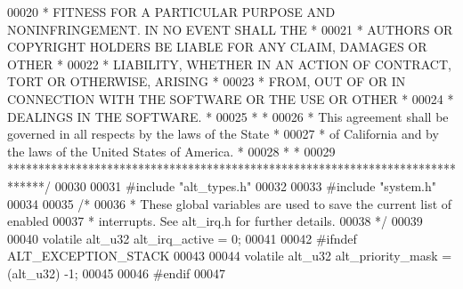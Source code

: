 \begin{DoxyCode}
00020 \textcolor{comment}{* FITNESS FOR A PARTICULAR PURPOSE AND NONINFRINGEMENT. IN NO EVENT SHALL THE *}
00021 \textcolor{comment}{* AUTHORS OR COPYRIGHT HOLDERS BE LIABLE FOR ANY CLAIM, DAMAGES OR OTHER      *}
00022 \textcolor{comment}{* LIABILITY, WHETHER IN AN ACTION OF CONTRACT, TORT OR OTHERWISE, ARISING     *}
00023 \textcolor{comment}{* FROM, OUT OF OR IN CONNECTION WITH THE SOFTWARE OR THE USE OR OTHER         *}
00024 \textcolor{comment}{* DEALINGS IN THE SOFTWARE.                                                   *}
00025 \textcolor{comment}{*                                                                             *}
00026 \textcolor{comment}{* This agreement shall be governed in all respects by the laws of the State   *}
00027 \textcolor{comment}{* of California and by the laws of the United States of America.              *}
00028 \textcolor{comment}{*                                                                             *}
00029 \textcolor{comment}{******************************************************************************/}
00030 
00031 \textcolor{preprocessor}{#include "alt_types.h"}
00032 
00033 \textcolor{preprocessor}{#include "system.h"}
00034 
00035 \textcolor{comment}{/*}
00036 \textcolor{comment}{ * These global variables are used to save the current list of enabled }
00037 \textcolor{comment}{ * interrupts. See alt\_irq.h for further details.}
00038 \textcolor{comment}{ */}
00039 
00040 \textcolor{keyword}{volatile} alt_u32 alt_irq_active    = 0;
00041 
00042 \textcolor{preprocessor}{#ifndef ALT\_EXCEPTION\_STACK}
00043 
00044 \textcolor{keyword}{volatile} alt_u32 alt_priority_mask = (alt_u32) -1;
00045 
00046 \textcolor{preprocessor}{#endif}
00047 
\end{DoxyCode}
